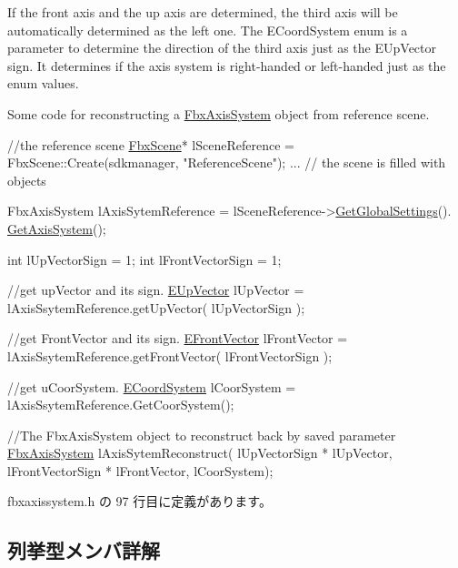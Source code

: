 If the front axis and the up axis are determined, the third axis will be automatically determined as the left one. The E\+Coord\+System enum is a parameter to determine the direction of the third axis just as the E\+Up\+Vector sign. It determines if the axis system is right-\/handed or left-\/handed just as the enum values.

Some code for reconstructing a \hyperlink{class_fbx_axis_system}{Fbx\+Axis\+System} object from reference scene. 
\begin{DoxyCode}
\textcolor{comment}{//the reference scene}
\hyperlink{class_fbx_scene}{FbxScene}* lSceneReference = FbxScene::Create(sdkmanager, \textcolor{stringliteral}{"ReferenceScene"});
...
\textcolor{comment}{// the scene is filled with objects}

FbxAxisSystem lAxisSytemReference = lSceneReference->\hyperlink{class_fbx_scene_a0cb767181a743532c9e9be17f0348570}{GetGlobalSettings}().
      \hyperlink{class_fbx_global_settings_adf26f4742b088b497a5ecec8f458e47d}{GetAxisSystem}();

\textcolor{keywordtype}{int} lUpVectorSign = 1;
\textcolor{keywordtype}{int} lFrontVectorSign = 1;

\textcolor{comment}{//get upVector and its sign.}
\hyperlink{class_fbx_axis_system_ad41a41f7ccd9167f54d09b65ad781d00}{EUpVector} lUpVector = lAxisSsytemReference.getUpVector( lUpVectorSign );

\textcolor{comment}{//get FrontVector and its sign.}
\hyperlink{class_fbx_axis_system_a34bce1daad7ed6ae71916bb825d3ec87}{EFrontVector} lFrontVector = lAxisSsytemReference.getFrontVector( lFrontVectorSign );

\textcolor{comment}{//get uCoorSystem. }
\hyperlink{class_fbx_axis_system_a7cf0485846b560fa34f86932c02ec333}{ECoordSystem} lCoorSystem = lAxisSsytemReference.GetCoorSystem();

\textcolor{comment}{//The FbxAxisSystem object to reconstruct back by saved parameter}
\hyperlink{class_fbx_axis_system}{FbxAxisSystem} lAxisSytemReconstruct( lUpVectorSign * lUpVector, 
                                      lFrontVectorSign * lFrontVector,
                                      lCoorSystem);
\end{DoxyCode}
 

 fbxaxissystem.\+h の 97 行目に定義があります。



\subsection{列挙型メンバ詳解}
\mbox{\label{class_fbx_axis_system_a7cf0485846b560fa34f86932c02ec333}} 
